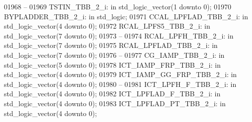 \begin{DoxyCode}
01968 \textcolor{keyword}{    --}
01969     TSTIN\_TBB\_2\_i:  \textcolor{keywordflow}{in} \textcolor{comment}{std\_logic\_vector}(\textcolor{vhdllogic}{}\textcolor{vhdllogic}{1} \textcolor{keywordflow}{downto} \textcolor{vhdllogic}{}\textcolor{vhdllogic}{0});
01970     BYPLADDER\_TBB\_2\_i:  \textcolor{keywordflow}{in} \textcolor{comment}{std\_logic};
01971     CCAL\_LPFLAD\_TBB\_2\_i:    \textcolor{keywordflow}{in} \textcolor{comment}{std\_logic\_vector}(\textcolor{vhdllogic}{}\textcolor{vhdllogic}{4} \textcolor{keywordflow}{downto} \textcolor{vhdllogic}{}\textcolor{vhdllogic}{0});
01972     RCAL\_LPFS5\_TBB\_2\_i: \textcolor{keywordflow}{in} \textcolor{comment}{std\_logic\_vector}(\textcolor{vhdllogic}{}\textcolor{vhdllogic}{7} \textcolor{keywordflow}{downto} \textcolor{vhdllogic}{}\textcolor{vhdllogic}{0});
01973 \textcolor{keyword}{    --}
01974     RCAL\_LPFH\_TBB\_2\_i:  \textcolor{keywordflow}{in} \textcolor{comment}{std\_logic\_vector}(\textcolor{vhdllogic}{}\textcolor{vhdllogic}{7} \textcolor{keywordflow}{downto} \textcolor{vhdllogic}{}\textcolor{vhdllogic}{0});
01975     RCAL\_LPFLAD\_TBB\_2\_i:    \textcolor{keywordflow}{in} \textcolor{comment}{std\_logic\_vector}(\textcolor{vhdllogic}{}\textcolor{vhdllogic}{7} \textcolor{keywordflow}{downto} \textcolor{vhdllogic}{}\textcolor{vhdllogic}{0});
01976 \textcolor{keyword}{    --}
01977     CG\_IAMP\_TBB\_2\_i:    \textcolor{keywordflow}{in} \textcolor{comment}{std\_logic\_vector}(\textcolor{vhdllogic}{}\textcolor{vhdllogic}{5} \textcolor{keywordflow}{downto} \textcolor{vhdllogic}{}\textcolor{vhdllogic}{0});
01978     ICT\_IAMP\_FRP\_TBB\_2\_i:   \textcolor{keywordflow}{in} \textcolor{comment}{std\_logic\_vector}(\textcolor{vhdllogic}{}\textcolor{vhdllogic}{4} \textcolor{keywordflow}{downto} \textcolor{vhdllogic}{}\textcolor{vhdllogic}{0});
01979     ICT\_IAMP\_GG\_FRP\_TBB\_2\_i:    \textcolor{keywordflow}{in} \textcolor{comment}{std\_logic\_vector}(\textcolor{vhdllogic}{}\textcolor{vhdllogic}{4} \textcolor{keywordflow}{downto} \textcolor{vhdllogic}{}\textcolor{vhdllogic}{0});
01980 \textcolor{keyword}{    --}
01981     ICT\_LPFH\_F\_TBB\_2\_i: \textcolor{keywordflow}{in} \textcolor{comment}{std\_logic\_vector}(\textcolor{vhdllogic}{}\textcolor{vhdllogic}{4} \textcolor{keywordflow}{downto} \textcolor{vhdllogic}{}\textcolor{vhdllogic}{0});
01982     ICT\_LPFLAD\_F\_TBB\_2\_i:   \textcolor{keywordflow}{in} \textcolor{comment}{std\_logic\_vector}(\textcolor{vhdllogic}{}\textcolor{vhdllogic}{4} \textcolor{keywordflow}{downto} \textcolor{vhdllogic}{}\textcolor{vhdllogic}{0});
01983     ICT\_LPFLAD\_PT\_TBB\_2\_i:  \textcolor{keywordflow}{in} \textcolor{comment}{std\_logic\_vector}(\textcolor{vhdllogic}{}\textcolor{vhdllogic}{4} \textcolor{keywordflow}{downto} \textcolor{vhdllogic}{}\textcolor{vhdllogic}{0});

\end{DoxyCode}
